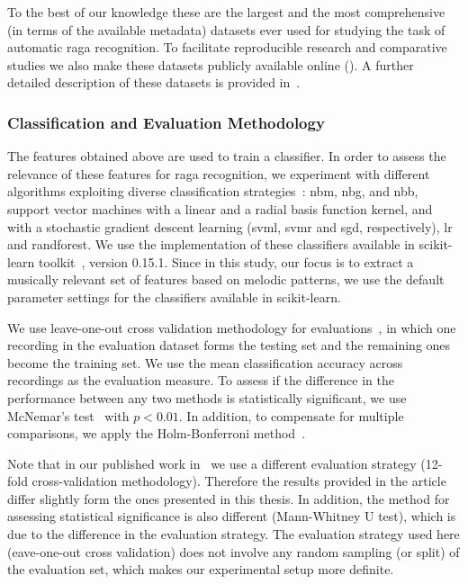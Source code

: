 To the best of our knowledge these are the largest and the most comprehensive (in terms of the available metadata) datasets ever used for studying the task of automatic \gls{raga} recognition. To facilitate reproducible research and comparative studies we also make these datasets publicly available online (). A further detailed description of these datasets is provided in~. 

\subsubsection{Classification and Evaluation Methodology}
\label{sec:raga_rec_pattern_classification_evaluation}

The features obtained above are used to train a classifier. In order to assess the relevance of these features for \gls{raga} recognition, we experiment with different algorithms exploiting diverse classification strategies~\citep{Hastie09BOOK}: \acrfull{nbm}, \acrfull{nbg}, and \acrfull{nbb}, support vector machines with a linear and a radial basis function kernel, and with a stochastic gradient descent learning (\acrshort{svml}, \acrshort{svmr} and \acrshort{sgd}, respectively), \acrfull{lr} and \acrfull{randforest}. We use the implementation of these classifiers available in scikit-learn toolkit~\citep{scikitlearn}, version 0.15.1. Since in this study, our focus is to extract a musically relevant set of features based on melodic patterns, we use the  default parameter settings for the classifiers available in scikit-learn. 

We use leave-one-out cross validation methodology for evaluations~\citep{Mitchell97BOOK}, in which one recording in the evaluation dataset forms the testing set and the remaining ones become the training set. We use the mean classification accuracy across recordings as the evaluation measure. To assess if the difference in the performance between any two methods is statistically significant, we use McNemar's test~\citep{mcnemar1947note} with $p < 0.01$. In addition, to compensate for multiple comparisons, we apply the Holm-Bonferroni method~\citep{holm1979simple}. 

Note that in our published work in~\cite{gulatiphrase_2016} we use a different evaluation strategy (12-fold cross-validation methodology). Therefore the results provided in the article differ slightly form the ones presented in this thesis. In addition, the method for assessing statistical significance is also different (Mann-Whitney U test), which is due to the difference in the evaluation strategy. The evaluation strategy used here (eave-one-out cross validation) does not involve any random sampling (or split) of the evaluation set, which makes our experimental setup more definite.

